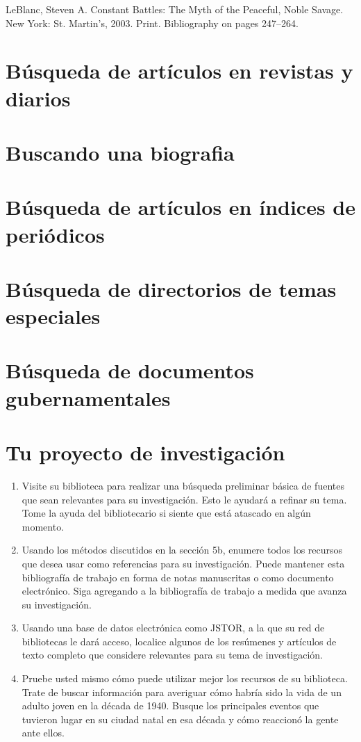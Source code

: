 LeBlanc, Steven A. Constant Battles: The Myth of the Peaceful, Noble Savage.
New York: St. Martin’s, 2003. Print. Bibliography on pages 247–264.\\

\section{Búsqueda de artículos en revistas y diarios}

\section{Buscando una biografia}

\section{Búsqueda de artículos en índices de periódicos}

\section{Búsqueda de directorios de temas especiales}

\section{Búsqueda de documentos gubernamentales}

\section{Tu proyecto de investigación}

\begin{enumerate}[1.]
    \item Visite su biblioteca para realizar una búsqueda preliminar básica de fuentes que sean relevantes para su investigación. Esto le ayudará a refinar su tema. Tome la ayuda del bibliotecario si siente que está atascado en algún momento. 
    \item Usando los métodos discutidos en la sección 5b, enumere todos los recursos que desea usar como referencias para su investigación. Puede mantener esta bibliografía de trabajo en forma de notas manuscritas o como documento electrónico. Siga agregando a la bibliografía de trabajo a medida que avanza su investigación. 
    \item Usando una base de datos electrónica como JSTOR, a la que su red de bibliotecas le dará acceso, localice algunos de los resúmenes y artículos de texto completo que considere relevantes para su tema de investigación.  
    \item Pruebe usted mismo cómo puede utilizar mejor los recursos de su biblioteca. Trate de buscar información para averiguar cómo habría sido la vida de un adulto joven en la década de 1940. Busque los principales eventos que tuvieron lugar en su ciudad natal en esa década y cómo reaccionó la gente ante ellos.
\end{enumerate}


